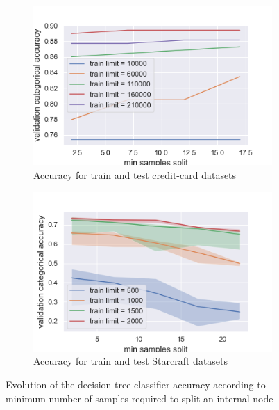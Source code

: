 \documentclass[twocolumn, a4paper, 10pt]{article}
\begin{document}
		\begin{figure}[]
			\centering
			\begin{subfigure}[]{0.8\columnwidth}
				\centering
				\includegraphics[width=\linewidth]{../graphics/tree_creditcard_min_samples_split_score_type_train_limit.png}
				\caption{Accuracy for train and test credit-card datasets}
				\label{tree:tree_creditcard_min_samples_split_score_type_train_limit}
			\end{subfigure}
			\begin{subfigure}[]{0.8\columnwidth}
				\centering
				\includegraphics[width=\linewidth]{../graphics/tree_starcraft_min_samples_split_score_type_train_limit.png}
				\caption{Accuracy for train and test Starcraft datasets}
				\label{tree:tree_starcraft_min_samples_split_score_type_train_limit}
			\end{subfigure}
			\caption{Evolution of the decision tree classifier accuracy according to minimum number of samples required to split an internal node}
			\label{tree:min_samples_split_score_type_score_type}
		\end{figure}
\end{document}

